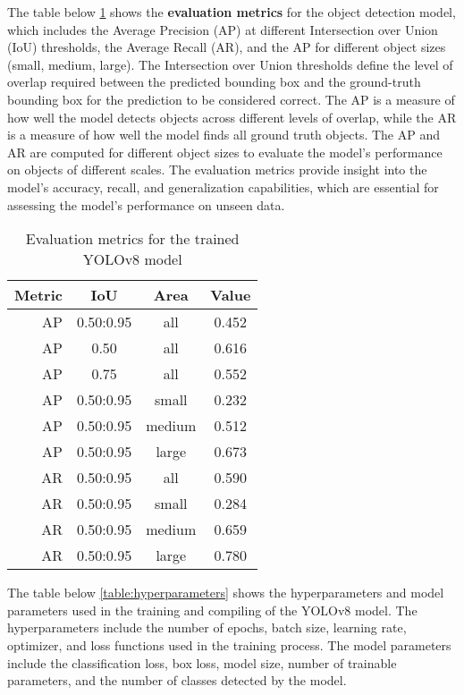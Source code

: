 The table below \ref{table:metrics} shows the \textbf{evaluation metrics} for the object detection model, which includes
the Average Precision (AP) at different Intersection over Union (IoU) thresholds, the Average Recall (AR),
and the AP for different object sizes (small, medium, large). The Intersection over Union thresholds define
the level of overlap required between the predicted bounding box and the ground-truth bounding box for the prediction
to be considered correct. The AP is a measure of how well the model detects objects across different levels of overlap,
while the AR is a measure of how well the model finds all ground truth objects. The AP and AR are computed for different
object sizes to evaluate the model's performance on objects of different scales. The evaluation metrics provide
insight into the model's accuracy, recall, and generalization capabilities, which are essential for assessing
the model's performance on unseen data.

\begin{table}[t]
    \centering
    \begin{tabular}{|r|c|c|c|}
    \hline
    \textbf{Metric} & \textbf{IoU} & \textbf{Area} & \textbf{Value} \\
    \hline
    AP & 0.50:0.95 & all & 0.452 \\
    AP & 0.50 & all & 0.616 \\
    AP & 0.75 & all & 0.552 \\
    AP & 0.50:0.95 & small & 0.232 \\
    AP & 0.50:0.95 & medium & 0.512 \\
    AP & 0.50:0.95 & large & 0.673 \\
    AR & 0.50:0.95 & all & 0.590 \\
    AR & 0.50:0.95 & small & 0.284 \\
    AR & 0.50:0.95 & medium & 0.659 \\
    AR & 0.50:0.95 & large & 0.780 \\
    \hline
    \end{tabular}
    \caption{Evaluation metrics for the trained YOLOv8 model}
    \label{table:metrics}
\end{table}
    
The table below \ref{table:hyperparameters} shows the hyperparameters and model parameters used in the training
and compiling of the YOLOv8 model. The hyperparameters include the number of epochs, batch size, learning rate,
optimizer, and loss functions used in the training process. The model parameters include the classification loss,
box loss, model size, number of trainable parameters, and the number of classes detected by the model.

